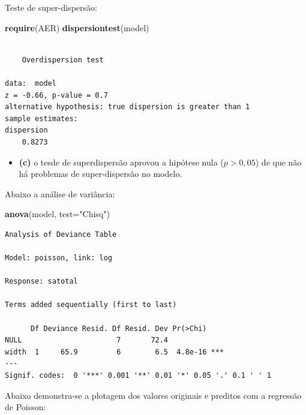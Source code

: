 \documentclass[12pt,brazil,oneside]{book}
\newenvironment{Shaded}{\begin{snugshade}}{\end{snugshade}}
\newcommand{\DataTypeTok}[1]{\textcolor[rgb]{0.13,0.29,0.53}{#1}}
\newcommand{\KeywordTok}[1]{\textcolor[rgb]{0.13,0.29,0.53}{\textbf{#1}}}
\newcommand{\NormalTok}[1]{#1}
\newcommand{\StringTok}[1]{\textcolor[rgb]{0.31,0.60,0.02}{#1}}
\providecommand{\tightlist}{%
  \setlength{\itemsep}{0pt}\setlength{\parskip}{0pt}}
\begin{document}
Teste de super-dispersão:

\begin{Shaded}
\begin{Highlighting}[]
\KeywordTok{require}\NormalTok{(AER)}
\KeywordTok{dispersiontest}\NormalTok{(model)}
\end{Highlighting}
\end{Shaded}

\begin{verbatim}

    Overdispersion test

data:  model
z = -0.66, p-value = 0.7
alternative hypothesis: true dispersion is greater than 1
sample estimates:
dispersion 
    0.8273 
\end{verbatim}

\begin{itemize}
\tightlist
\item
  \textbf{(c)} o tesde de superdispersão aprovou a hipótese nula
  (\(p>0,05\)) de que não há problemas de super-dispersão no modelo.
\end{itemize}

Abaixo a análise de variância:

\begin{Shaded}
\begin{Highlighting}[]
\KeywordTok{anova}\NormalTok{(model, }\DataTypeTok{test=}\StringTok{"Chisq"}\NormalTok{)}
\end{Highlighting}
\end{Shaded}

\begin{verbatim}
Analysis of Deviance Table

Model: poisson, link: log

Response: satotal

Terms added sequentially (first to last)

      Df Deviance Resid. Df Resid. Dev Pr(>Chi)    
NULL                      7       72.4             
width  1     65.9         6        6.5  4.8e-16 ***
---
Signif. codes:  0 '***' 0.001 '**' 0.01 '*' 0.05 '.' 0.1 ' ' 1
\end{verbatim}

Abaixo demonstra-se a plotagem dos valores originais e preditos com a
regressão de Poisson:
\end{document}
